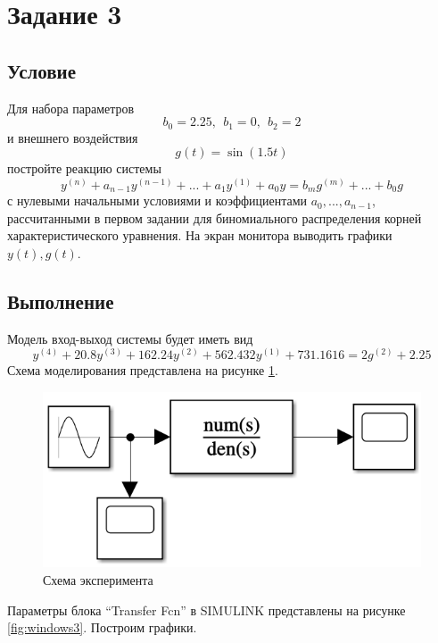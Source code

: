 \documentclass[a4paper, 12pt]{article}
\begin{document}
    \section{Задание 3}
    \subsection{Условие}
    Для набора параметров $$b_0=2.25,\ \ b_1=0,\ \ b_2=2$$ и внешнего воздействия
    $$g(t)=\sin{\left(1.5t\right)}$$ постройте реакцию системы
    $$y^{(n)}+a_{n-1}y^{(n-1)}+...+a_1y^{(1)}+a_0y=b_mg^{(m)}+...+b_0g$$ с нулевыми начальными
    условиями и коэффициентами $a_0,...,a_{n-1}$, рассчитанными
    в первом задании для биномиального распределения корней характеристического уравнения.
    На экран монитора выводить графики $y(t),g(t)$.


    \subsection{Выполнение}
    Модель вход-выход системы будет иметь вид
    $$y^{(4)}+20.8y^{(3)}+162.24y^{(2)}+562.432y^{(1)}+731.1616=2g^{(2)}+2.25$$
    Схема моделирования представлена на рисунке \ref{fig:scheme3}.
    \begin{figure}[H]
        \centering
        \includegraphics[scale=0.8]{scheme3.png}
        \captionsetup{skip=0pt}
        \caption{Схема эксперимента}
        \label{fig:scheme3}
    \end{figure}
    \noindent Параметры блока ``Transfer Fcn'' в SIMULINK представлены на рисунке \ref{fig:windows3}. Построим графики.
\end{document}
